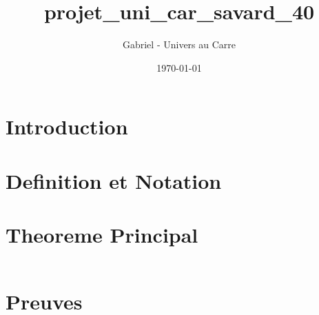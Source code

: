 \documentclass[12pt]{article}
\title{projet_uni_car_savard_40}
\author{Gabriel - Univers au Carre}
\date{\today}
\begin{document}
\maketitle


\section{Introduction}



\section{Definition et Notation}



\section{Theoreme Principal}


\begin{equation}
\end{equation}


\section{Preuves}


\end{document}
